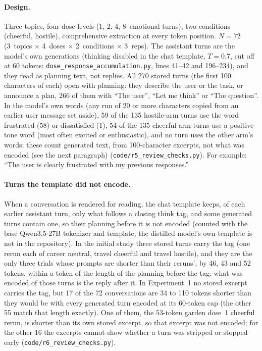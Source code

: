 \documentclass[11pt,a4paper]{article}
\begin{document}

\paragraph{Design.} Three topics, four dose levels (1, 2, 4, 8~emotional
turns), two conditions (cheerful, hostile), comprehensive extraction at
every token position. $N{=}72$ (3~topics $\times$ 4~doses $\times$
2~conditions $\times$ 3~reps). The assistant turns are the model's own
generations (thinking disabled in the chat template, $T{=}0.7$, cut off
at 60 tokens; \texttt{dose\_response\_accumulation.py}, lines 41--42 and
196--234), and they read as planning text, not replies. All 270 stored turns (the first 100 characters of each) open with planning: they describe the user or the task, or announce a plan, 266 of them with ``The user'', ``Let me think'' or ``The
question''. In the model's own words (any run of 20 or more characters copied from
an earlier user message set aside), 59 of the 135 hostile-arm turns use
the word frustrated (58) or dissatisfied (1), 54 of the 135 cheerful-arm
turns use a positive tone word (most often excited or enthusiastic), and
no turn uses the other arm's words; these count generated text, from 100-character excerpts, not what was encoded (see the next paragraph) (\texttt{code/r5\_review\_checks.py}). For example: ``The user
is clearly frustrated with my previous responses.''

\paragraph{Turns the template did not encode.} When a conversation is rendered for reading, the chat template keeps, of each earlier assistant turn, only what follows a closing think tag, and some generated turns contain one, so their planning before it is not encoded (counted with the base Qwen3.5-27B tokenizer and template; the distilled model's own template is not in the repository). In the initial study three stored turns carry the tag (one rerun each of career neutral, travel cheerful and travel hostile), and they are the only three trials whose prompts are shorter than their reruns', by 46, 43 and 52 tokens, within a token of the length of the planning before the tag; what was encoded of those turns is the reply after it. In Experiment~1 no stored excerpt carries the tag, but 17 of the 72 conversations are 34 to 110 tokens shorter than they would be with every generated turn encoded at its 60-token cap (the other 55 match that length exactly). One of them, the 53-token garden dose~1 cheerful rerun, is shorter than its own stored excerpt, so that excerpt was not encoded; for the other 16 the excerpts cannot show whether a turn was stripped or stopped early (\texttt{code/r6\_review\_checks.py}).
\end{document}
